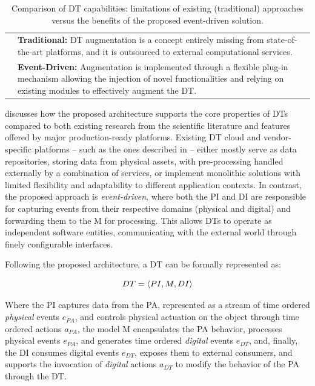 \begin{table}[hp]
\begin{tabularx}{\textwidth}{>{\arraybackslash}m{2.5cm} >{\arraybackslash}X}
\multirow{2}{*}{\textbf{Augmentation}} 
& \textbf{Traditional:} DT augmentation is a concept entirely missing from state-of-the-art platforms, and it is outsourced to external computational services. \\
& \textbf{Event-Driven:} Augmentation is implemented through a flexible plug-in mechanism allowing the injection of novel functionalities and relying on existing modules to effectively augment the DT. \\ \hline
\end{tabularx}

\caption{Comparison of DT capabilities: limitations of existing (traditional) approaches versus the benefits of the proposed event-driven solution.}
\label{tab:evaluation}
\end{table}


 discusses how the proposed architecture supports the core properties of \acp{DT}~\cite{dt-IoT-context-Minerva-2020} compared to both existing research from the scientific literature and features offered by major production-ready platforms.
%
Existing \ac{DT} cloud and vendor-specific platforms -- such as the ones described in  -- either mostly serve as data repositories, storing data from physical assets, with pre-processing handled externally by a combination of services, or implement monolithic solutions with limited flexibility and adaptability to different application contexts.
%
In contrast, the proposed approach is \emph{event-driven}, where both the \ac{PI} and \ac{DI} are responsible for capturing events from their respective domains (physical and digital) and forwarding them to the \ac{M} for processing. This allows \acp{DT} to operate as independent software entities, communicating with the external world through finely configurable interfaces.

Following the proposed architecture, a \ac{DT} can be formally represented as:

\begin{equation} 
\label{eq:dt_basic_model}
        DT = \langle PI, M, DI \rangle\\
\end{equation}

Where the \ac{PI} captures data from the \acf{PA}, represented as a stream of time ordered \emph{physical} events $e_{PA}$, and controls physical actuation on the object through time ordered actions $a_{PA}$, 
%
the model \ac{M} encapsulates the \ac{PA} behavior, processes physical events $e_{PA}$, and generates time ordered \emph{digital} events $e_{DT}$,
%
and, finally, the \ac{DI} consumes digital events $e_{DT}$, exposes them to external consumers, and supports the invocation of \emph{digital} actions $a_{DT}$ to modify the behavior of the \ac{PA} through the \ac{DT}.


